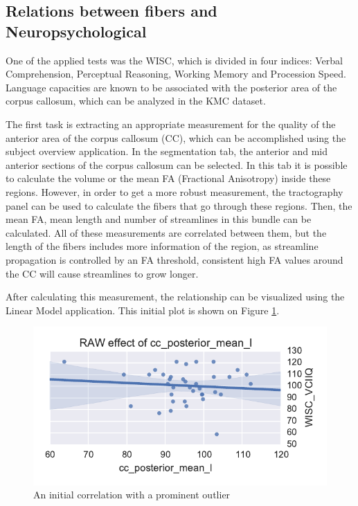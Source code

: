 \documentclass[twocolumn]{svjour3}
\begin{document}
\subsection{Relations between fibers and Neuropsychological}

One of the applied tests was the WISC, which is divided in four indices: Verbal Comprehension, Perceptual Reasoning, Working Memory and Procession Speed. 	Language capacities are known to be associated with the posterior area of the corpus callosum, which can be analyzed in the KMC dataset. 

The first task is extracting an appropriate measurement for the quality of the anterior area of the corpus callosum (CC), which can be accomplished using the subject overview application. In the segmentation tab, the anterior and mid anterior sections of the corpus callosum can be selected. In this tab it is possible to calculate the volume or the mean FA (Fractional Anisotropy) inside these regions. However, in order to get a more robust measurement, the tractography panel can be used to calculate the fibers that go through these regions. Then, the mean FA, mean length and number of streamlines in this bundle can be calculated. All of these measurements are correlated between them, but the length of the fibers includes more information of the region, as streamline propagation is controlled by an FA threshold, consistent high FA values around the CC will cause streamlines to grow longer.

After calculating this measurement, the relationship can be visualized using the Linear Model application. This initial plot is shown on Figure \ref{fig_lm}.

\begin{figure}
\begin{center}
\includegraphics[width=\linewidth]{figures/cases/initial_corr}
\end{center}
 \caption{\label{fig_lm}An initial correlation with a prominent outlier}
\end{figure}
\end{document}
